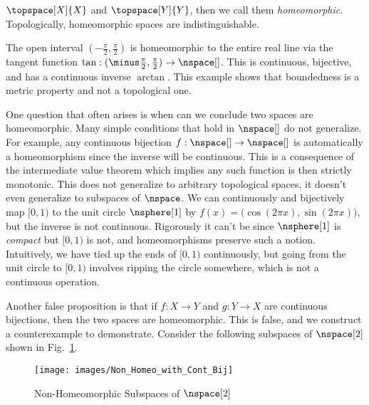 \documentclass{book}                                                           %
\begin{document}
                $\topspace[X]{X}$ and $\topspace[Y]{Y}$, then we call them
                \textit{homeomorphic}. Topologically, homeomorphic spaces are
                indistinguishable.
                \begin{example}
                    The open interval $(\minus\frac{\pi}{2},\frac{\pi}{2})$ is
                    homeomorphic to the entire real line via the tangent
                    function $\tan:(\minus\frac{\pi}{2},\frac{\pi}{2})%
                    \rightarrow\nspace[]$. This is continuous, bijective, and
                    has a continuous inverse $\arctan$. This example shows that
                    boundedness is a metric property and not a topological one.
                \end{example}
                One question that often arises is when can we conclude two
                spaces are homeomorphic. Many simple conditions that hold in
                $\nspace[]$ do not generalize. For example, any continuous
                bijection $f:\nspace[]\rightarrow\nspace[]$ is automatically a
                homeomorphism since the inverse will be continuous. This is a
                consequence of the intermediate value theorem which implies any
                such function is then strictly monotonic. This does not
                generalize to arbitrary topological spaces, it doesn't even
                generalize to subspaces of $\nspace$. We can continuously and
                bijectively map $[0,1)$ to the unit circle $\nsphere[1]$ by
                $f(x)=\big(\cos(2\pi{x}),\sin(2\pi{x})\big)$, but the inverse is
                not continuous. Rigorously it can't be since $\nsphere[1]$ is
                \textit{compact} but $[0,1)$ is not, and homeomorphisms preserve
                such a notion. Intuitively, we have tied up the ends of $[0,1)$
                continuously, but going from the unit circle to $[0,1)$ involves
                ripping the circle somewhere, which is not a continuous
                operation.
                \par\hfill\par
                Another false proposition is that if $f:X\rightarrow{Y}$ and
                $g:Y\rightarrow{X}$ are continuous bijections, then the two
                spaces are homeomorphic. This is false, and we construct a
                counterexample to demonstrate. Consider the following subspaces
                of $\nspace[2]$ shown in
                Fig.~\ref{fig:Non_Homeomorphic_Subspace}.
                \begin{figure}[H]
                    \centering
                    \captionsetup{type=figure}
                    \texttt{[image: images/Non\_Homeo\_with\_Cont\_Bij]}
                    \caption{Non-Homeomorphic Subspaces of $\nspace[2]$}
                    \label{fig:Non_Homeomorphic_Subspace}
                \end{figure}
\end{document}
